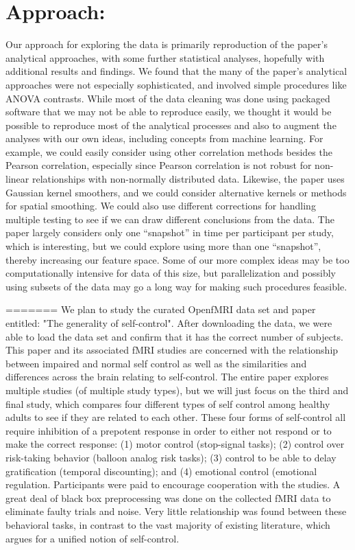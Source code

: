 \documentclass[11pt]{article}
\begin{document}
\section{Approach:}
Our approach for exploring the data is primarily reproduction of the paper’s analytical approaches, with some further statistical analyses, hopefully with additional results and findings. We found that the many of the paper’s analytical approaches were not especially sophisticated, and involved simple procedures like ANOVA contrasts. While most of the data cleaning was done using packaged software that we may not be able to reproduce easily, we thought it would be possible to reproduce most of the analytical processes and also to augment the analyses with our own ideas, including concepts from machine learning. For example, we could easily consider using other correlation methods besides the Pearson correlation, especially since Pearson correlation is not robust for non-linear relationships with non-normally distributed data. Likewise, the paper uses Gaussian kernel smoothers, and we could consider alternative kernels or methods for spatial smoothing. We could also use different corrections for handling multiple testing to see if we can draw different conclusions from the data. The paper largely considers only one “snapshot” in time per participant per study, which is interesting, but we could explore using more than one “snapshot”, thereby increasing our feature space. Some of our more complex ideas may be too computationally intensive for data of this size, but parallelization and possibly using subsets of the data may go a long way for making such procedures feasible. 


=======
We plan to study the curated OpenfMRI data set and paper entitled: "The generality of self-control". After downloading the data, we were able to load the data set and confirm that it has the correct number of subjects. This paper and its associated fMRI studies are concerned with the relationship between impaired and normal self control as well as the similarities and differences across the brain relating to self-control. The entire paper explores multiple studies (of multiple study types), but we will just focus on the third and final study, which compares four different types of self control among healthy adults to see if they are related to each other. These four forms of self-control all require inhibition of a prepotent response in order to either not respond or to make the correct response: (1) motor control (stop-signal tasks); (2) control over risk-taking behavior (balloon analog risk tasks); (3) control to be able to delay gratification (temporal discounting); and (4) emotional control (emotional regulation. Participants were paid to encourage cooperation with the studies. A great deal of black box preprocessing was done on the collected fMRI data to eliminate faulty trials and noise. Very little relationship was found between these behavioral tasks, in contrast to the vast majority of existing literature, which argues for a unified notion of self-control.
\end{document}

